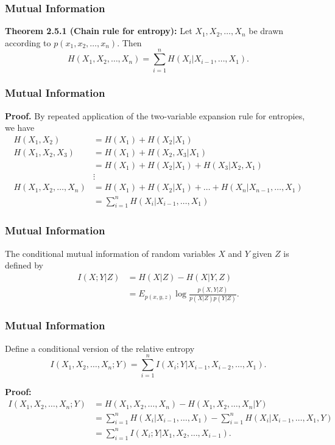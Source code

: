 \documentclass[
	10pt, %
]{beamer}
\begin{document}
\begin{frame}
\frametitle{Mutual Information}
\begin{definition}
     \textbf{Theorem 2.5.1 (Chain rule for entropy):} Let $X_1, X_2, \dots, X_n$ be drawn according to $p(x_1, x_2, \dots, x_n)$. Then
    \[ H(X_1, X_2, \dots, X_n) = \sum_{i=1}^{n} H(X_i | X_{i-1}, \dots, X_1). \]
\end{definition}
\end{frame}
\begin{frame}
\frametitle{Mutual Information}
\textbf{Proof.}
By repeated application of the two-variable expansion rule for entropies, we have
    \begin{align*}
        H(X_1, X_2) &= H(X_1) + H(X_2 | X_1) \quad \\
        H(X_1, X_2, X_3) &= H(X_1) + H(X_2, X_3 | X_1) \\
        &= H(X_1) + H(X_2 | X_1) + H(X_3 | X_2, X_1) \quad \\
        &\vdots \\
        H(X_1, X_2, \dots, X_n) &= H(X_1) + H(X_2 | X_1) + \dots + H(X_n | X_{n-1}, \dots, X_1) \\
        &= \sum_{i=1}^{n} H(X_i | X_{i-1}, \dots, X_1) \quad
    \end{align*}
\end{frame}
\begin{frame}
\frametitle{Mutual Information}
 \begin{definition}
    The conditional mutual information of random variables $X$ and $Y$ given $Z$ is defined by
    \begin{align*}
        I(X; Y | Z) &= H(X|Z) - H(X|Y, Z) \\
        &= E_{p(x,y,z)} \log \frac{p(X, Y | Z)}{p(X|Z)p(Y |Z)}.
    \end{align*}
    \end{definition}
\end{frame}
\begin{frame}
\frametitle{Mutual Information}
 \begin{definition}
 Define a conditional version of the relative entropy
    \[ I(X_1,X_2,\dots,X_n; Y) = \sum_{i=1}^{n} I(X_i; Y | X_{i-1}, X_{i-2}, \dots, X_1). \]

     \textbf{Proof:}
    \begin{align*}
        I(X_1,X_2,\dots,X_n; Y) &= H(X_1,X_2,\dots,X_n) - H(X_1,X_2,\dots,X_n | Y) \\
        &= \sum_{i=1}^{n} H(X_i | X_{i-1}, \dots, X_1) - \sum_{i=1}^{n} H(X_i | X_{i-1}, \dots, X_1, Y) \\
        &= \sum_{i=1}^{n} I(X_i; Y | X_1, X_2, \dots, X_{i-1}).  
    \end{align*}
    \end{definition}
\end{frame}
\end{document}
